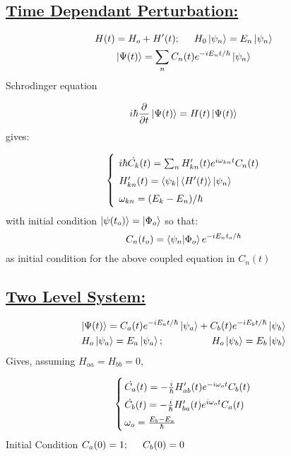 \newpage
\subsection*{\underline{Time Dependant Perturbation:}}

\begin{gather*}
	H(t) = H_o +H'(t); \hspace{0.5 cm} H_0\ket{\psi_n} = E_n\ket{\psi_n}\\
	\ket{\Psi(t)} = \sum_n{C_n(t) e^{-iE_nt/\hbar}}\ket{\psi_n}
\end{gather*}
Schrodinger equation

\begin{equation*}
	i\hbar\frac{\partial}{\partial t}\ket{\Psi(t)} = H(t)\ket{\Psi(t)}
\end{equation*}
gives:

\begin{equation*}
	\left\{ \arraycolsep=1.4pt\def\arraystretch{1.5}
	\begin{array}{ll}
			\;i\hbar\dot{C_k} (t) =  \sum_n{H'_{kn}(t)e^{i\omega_{kn}t}C_n(t)}\\
			\;H'_{kn}(t) = \bra{\psi_k}\expval{H'(t)}\ket{\psi_n}\\
			\;\omega_{kn} = (E_k-E_n)/\hbar\\
	\end{array} \right.
\end{equation*}
with initial condition $\ket{\psi(t_o)} = \ket{\Phi_o}$ so that:
\begin{equation*}
	C_n(t_o) = \bra{\psi_n}\ket{\Phi_o}e^{-iE_nt_o/\hbar}
\end{equation*}
as initial condition for the above coupled equation in $C_n(t)$

\subsection*{\underline{Two Level System:}}
\begin{gather*}
	\ket{\Psi(t)} = C_a(t)e^{-iE_at/\hbar}\ket{\psi_a} + C_b(t)e^{-iE_bt/\hbar}\ket{\psi_b}\\
	H_o\ket{\psi_a} = E_a\ket{\psi_a}; \hspace{1.7 cm} H_o\ket{\psi_b} = E_b\ket{\psi_b}
\end{gather*}
Gives, assuming $H_{aa} = H_{bb} = 0$,

\begin{equation*}
	\left\{ \arraycolsep=1.4pt\def\arraystretch{1.5}
 	\begin{array}{ll}
			\dot{C_a} (t) =  -\frac{i}{\hbar}H'_{ab}(t)e^{-i\omega_{o}t}C_b(t)\\ 
			\dot{C_b} (t) =  -\frac{i}{\hbar}H'_{ba}(t)e^{i\omega_{o}t}C_a(t)\\
			\omega_o = \frac{E_b-E_a}{\hbar}
	\end{array} \right.
\end{equation*}
Initial Condition $C_a(0) = 1; \hspace{0.5 cm} C_b(0)=0$

